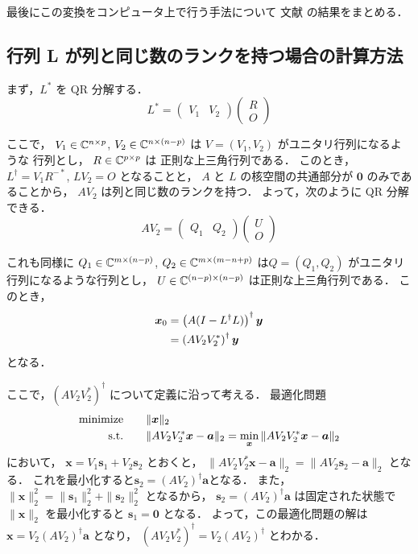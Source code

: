 最後にこの変換をコンピュータ上で行う手法について
文献 \cite{Elden1982, Hansen1994} の結果をまとめる．

\subsection{行列 L が列と同じ数のランクを持つ場合の計算方法}

まず，$L^*$ を QR 分解する．
\begin{equation}
    L^* = \begin{pmatrix}
        V_1 & V_2
    \end{pmatrix}\begin{pmatrix}
        R \\ O
    \end{pmatrix}
\end{equation}

ここで，
$V_1 \in \mathbb{C}^{n \times p}$,
$V_2 \in \mathbb{C}^{n \times (n-p)}$
は $V = (V_1, V_2)$ がユニタリ行列になるような
行列とし，
$R \in \mathbb{C}^{p \times p}$ は
正則な上三角行列である．
このとき，$L^\dagger = V_1 R^{-*}$, $LV_2 = O$ となることと，
$A$ と $L$ の核空間の共通部分が $\bm{0}$ のみであることから，
$AV_2$ は列と同じ数のランクを持つ．
よって，次のように QR 分解できる．
\begin{equation}
    AV_2 = \begin{pmatrix}
        Q_1 & Q_2
    \end{pmatrix}\begin{pmatrix}
        U \\ O
    \end{pmatrix}
\end{equation}

これも同様に
$Q_1 \in \mathbb{C}^{m \times (n-p)}$,
$Q_2 \in \mathbb{C}^{m \times (m-n+p)}$
は$Q = (Q_1, Q_2)$ がユニタリ行列になるような行列とし，
$U \in \mathbb{C}^{(n - p) \times (n - p)}$
は正則な上三角行列である．
このとき，
\begin{align}
    \bm{x}_0 & = \left(A (I - L^\dagger L)\right)^\dagger \bm{y} \notag \\
             & = \left(A V_2 V_2^*\right)^\dagger \bm{y}
\end{align}
となる．

ここで，$(AV_2V_2^*)^\dagger$ について定義に沿って考える．
最適化問題
\begin{align}
    \text{minimize} \hspace{2em} & \|\bm{x}\|_2 \notag                                                                    \\
    \text{s.t.} \hspace{2em}     & \|AV_2V_2^* \bm{x} - \bm{a}\|_2 = \min_{\bm{x}} \|AV_2V_2^* \bm{x} - \bm{a}\|_2 \notag
\end{align}
において，
$\bm{x} = V_1 \bm{s}_1 + V_2 \bm{s}_2$
とおくと，
$\|A V_2 V_2^* \bm{x} - \bm{a}\|_2 = \|A V_2 \bm{s}_2 - \bm{a}\|_2$
となる．
これを最小化すると$\bm{s}_2=(AV_2)^\dagger\bm{a}$となる．
また，
$\|\bm{x}\|_2^2 = \|\bm{s}_1\|_2^2 + \|\bm{s}_2\|_2^2$
となるから，
$\bm{s}_2 = (A V_2)^\dagger \bm{a}$
は固定された状態で
$\|\bm{x}\|_2$
を最小化すると
$\bm{s}_1=\bm{0}$
となる．
よって，この最適化問題の解は
$\bm{x} = V_2 (A V_2)^\dagger \bm{a}$
となり，
$(A V_2 V_2^*)^\dagger = V_2 (A V_2)^\dagger$
とわかる．

